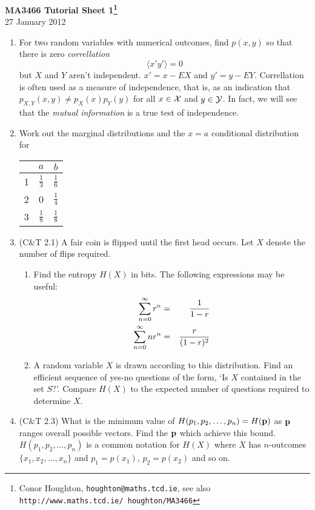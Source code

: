 \documentclass[12pt]{article}
\begin{document}
\begin{center}
{\bf MA3466 Tutorial Sheet 1\footnote{Conor Houghton, {\tt houghton@maths.tcd.ie}, see also {\tt http://www.maths.tcd.ie/ houghton/MA3466}}}\\[1cm]{} 27 January 2012
\end{center}
\begin{enumerate}

\item For two random variables with numerical outcomes, find $p(x,y)$ so that there is zero {\sl correllation}
\begin{equation}
\langle x'y'\rangle=0 
\end{equation}
but $X$ and $Y$ aren't independent. $x'=x-EX$ and
$y'=y-EY$. Correllation is often used as a measure of independence,
that is, as an indication that $p_{X,Y}(x,y)\not=p_X(x)p_Y(y)$ for all
$x\in{\cal X}$ and $y\in{\cal Y}$. In fact, we will see that the {\sl
  mutual information} is a true test of independence.

\item Work out the marginal distributions and the $x=a$ conditional distribution for
\begin{center}
\begin{tabular}{c|cc}
&$a$&$b$\\
\hline
1&$\frac{1}{3}$&$\frac{1}{6}$\\
2&0&$\frac{1}{4}$\\
3&$\frac{1}{8}$&$\frac{1}{8}$
\end{tabular}
\end{center}

\item (C\&T 2.1) A fair coin is flipped until the first head occurs. Let $X$ denote the number of flips required.
\begin{enumerate}
\item Find the entropy $H(X)$ in bits. The following expressions may be useful:\begin{eqnarray}
\sum_{n=0}^{\infty} r^n&=&\frac{1}{1-r}\cr
\sum_{n=0}^{\infty}nr^n&=&\frac{r}{(1-r)^2}
\end{eqnarray}
\item A random variable $X$ is drawn according to this distribution. Find an efficient sequence of yes-no questions of the form, \lq Is $X$ contained in the set $S$?\rq{}. Compare $H(X)$ to the expected number of questions required to determine $X$.
\end{enumerate}

\item (C\&T 2.3) What is the minimum value of $H(p_1,p_2,\ldots,p_n)=H({\bf p})$ as ${\bf p}$ ranges overall possible vectors. Find the ${\bf p}$ which achieve this bound. $H(p_1,p_2,\ldots,p_n)$ is a common notation for $H(X)$ where $X$ has $n$-outcomes $\{x_1,x_2,\ldots,x_n\}$ and $p_1=p(x_1)$, $p_2=p(x_2)$ and so on.


\end{enumerate}
\end{document}
